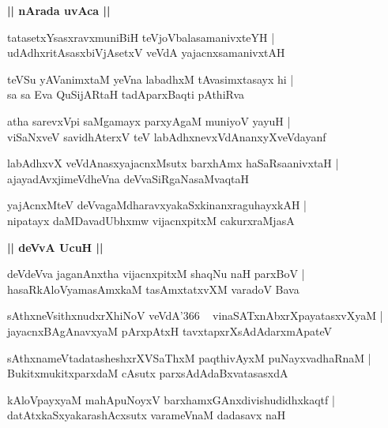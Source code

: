 \documentclass[twoside,12pt,openright]{book}
\newcounter{shloka}[chapter]
\def\uvaca#1{\centerline{{\large\textbf{#1}}}}
\begin{document}
\uvaca{|| nArada uvAca ||}

\begin{shloka}%
tatasetxYsasxravxmuniBiH teVjoVbalasamanivxteYH |\\
udAdhxritAsasxbiVjAsetxV veVdA yajacnxsamanivxtAH
\end{shloka}

\begin{shloka}%
teVSu yAVanimxtaM yeVna labadhxM tAvasimxtasayx hi |\\
sa sa Eva QuSijARtaH tadAparxBaqti pAthiRva 
\end{shloka}

\begin{shloka}%
atha sarevxVpi saMgamayx parxyAgaM muniyoV yayuH |\\
viSaNxveV savidhAterxV teV labAdhxnevxVdAnanxyXveVdayanf 
\end{shloka}

\begin{shloka}%
labAdhxvX veVdAnasxyajacnxMsutx barxhAmx haSaRsaanivxtaH |\\
ajayadAvxjimeVdheVna deVvaSiRgaNasaMvaqtaH 
\end{shloka}

\begin{shloka}%
yajAcnxMteV deVvagaMdharavxyakaSxkinanxraguhayxkAH |\\
nipatayx daMDavadUbhxmw vijacnxpitxM cakurxraMjasA 
\end{shloka}

\uvaca{|| deVvA UcuH ||}

\begin{shloka}%
deVdeVva jaganAnxtha vijacnxpitxM shaqNu naH parxBoV |\\
hasaRkAloVyamasAmxkaM tasAmxtatxvXM varadoV Bava
\end{shloka}

\begin{shloka}%
sAthxneVsithxnudxrXhiNoV veVdA\char'366 ~ vinaSATxnAbxrXpayatasxvXyaM |\\
jayacnxBAgAnavxyaM pArxpAtxH tavxtapxrXsAdAdarxmApateV 
\end{shloka}

\begin{shloka}%
sAthxnameVtadatasheshxrXVSaThxM paqthivAyxM puNayxvadhaRnaM |\\
BukitxmukitxparxdaM cAsutx parxsAdAdaBxvatasasxdA 
\end{shloka}

\begin{shloka}%
kAloVpayxyaM mahApuNoyxV barxhamxGAnxdivishudidhxkaqtf |\\
datAtxkaSxyakarashAcxsutx varameVnaM dadasavx naH 
\end{shloka}
\end{document}
